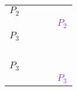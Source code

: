 \documentclass[10pt]{beamer}
\begin{document}
\begin{frame}
\begin{tabularx}{0.6\textwidth}{XcccY}
        \textcolor{Sepia}{\parbox{0.5cm}{$P_2$} }                                                                                                             &                                                       &                  &  &                                                                                                                                                                                  \\
                                                                                                                                                                                    &                                                       &                  &  & \textcolor{BlueViolet}{ \parbox{0.5cm}{$P_2$}}                                                                                                             \\
        \textcolor{Sepia}{\parbox{0.5cm}{$P_3$} }                                                                                                             &                                                       &  &  &                                                                                                                                                                                  \\
                                                                                                                                                                                    &  &                  &  & \textcolor{BlueViolet}{ \parbox{0.5cm}{ \ }}                                                                                                               \\
        \textcolor{Sepia}{\parbox{0.5cm}{$P_3$} }                                                                                                             &                                                       &                  &  &                                                                                                                                                                                  \\
                                                                                                                                                                                    &                                                       &                  &  & \textcolor{BlueViolet}{ \parbox{0.5cm}{$P_3$}}                                                                                                             \\

\end{tabularx}
\end{frame}
\end{document}
